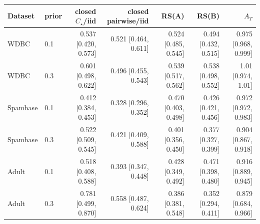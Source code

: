 \begin{tabular}{llrrrrr}
\toprule
Dataset & prior & closed $C_\star$/iid & closed pairwise/iid & RS(A) & RS(B) & $A_T$ \\
\midrule
WDBC & 0.1 & 0.537 [0.420, 0.573] & 0.521 [0.464, 0.611] & 0.524 [0.485, 0.545] & 0.494 [0.432, 0.515] & 0.975 [0.968, 0.999] \\
WDBC & 0.3 & 0.601 [0.498, 0.622] & 0.496 [0.455, 0.543] & 0.539 [0.517, 0.562] & 0.538 [0.498, 0.552] & 1.01 [0.974, 1.01] \\
Spambase & 0.1 & 0.412 [0.384, 0.453] & 0.328 [0.296, 0.352] & 0.470 [0.403, 0.498] & 0.426 [0.421, 0.456] & 0.972 [0.972, 0.983] \\
Spambase & 0.3 & 0.522 [0.509, 0.545] & 0.421 [0.409, 0.588] & 0.401 [0.356, 0.450] & 0.377 [0.327, 0.399] & 0.904 [0.867, 0.918] \\
Adult & 0.1 & 0.518 [0.408, 0.588] & 0.393 [0.347, 0.448] & 0.428 [0.349, 0.492] & 0.471 [0.398, 0.480] & 0.916 [0.889, 0.945] \\
Adult & 0.3 & 0.781 [0.499, 0.870] & 0.558 [0.487, 0.624] & 0.386 [0.381, 0.548] & 0.352 [0.294, 0.411] & 0.879 [0.684, 0.966] \\
\bottomrule
\end{tabular}
